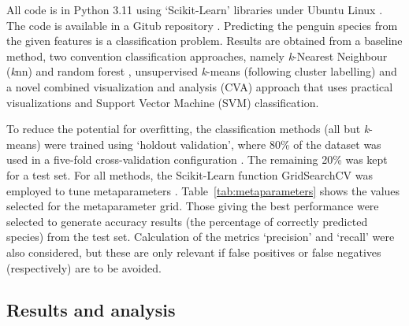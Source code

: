 \documentclass[12pt]{article}
\begin{document}
All code is in Python 3.11 \cite{python311} using ‘Scikit-Learn’ libraries \cite{scikit-learn} 
under Ubuntu Linux \cite{ubuntu}. The code is available in a Gitub repository \cite{TimAIRepo}. 
Predicting the penguin species from the given features is a classification problem. 
Results are obtained from a baseline method, two convention classification approaches, 
namely \textit{k}-Nearest Neighbour (\textit{k}nn) \cite{bishop2006pattern} and random forest \cite{breiman2001random}, 
unsupervised \textit{k}-means (following cluster labelling) \cite{tan2005introduction} 
and a novel combined visualization and analysis (CVA) approach that uses 
practical visualizations and Support Vector Machine (SVM) classification.

To reduce the potential for overfitting, the classification methods (all but \textit{k}-means) were trained using 
`holdout validation', where 80\% of the dataset was used in a five-fold cross-validation 
configuration \cite{james2013introduction}. The remaining 20\% was kept for a test set. For all methods, 
the Scikit-Learn function GridSearchCV was employed to tune metaparameters \cite{scikit-learn}. 
Table~\ref{tab:metaparameters} shows the values selected for the metaparameter grid. Those giving the best 
performance were selected to generate accuracy results (the percentage of correctly predicted species) 
from the test set. Calculation of the metrics `precision' and `recall' were also considered, 
but these are only relevant if false positives or false negatives (respectively) are to be avoided.   

\subsection*{Results and analysis}
\end{document}
